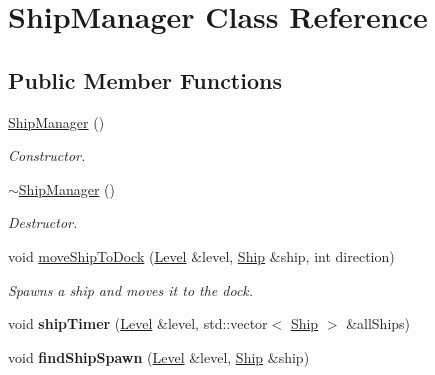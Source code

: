 \hypertarget{class_ship_manager}{}\section{Ship\+Manager Class Reference}
\label{class_ship_manager}
\subsection*{Public Member Functions}
\begin{DoxyCompactItemize}
\item 
\mbox{\label{class_ship_manager_a5c7bc1182e2083180ec4e9f561880ba6}} 
\hyperlink{class_ship_manager_a5c7bc1182e2083180ec4e9f561880ba6}{Ship\+Manager} ()
\begin{DoxyCompactList}\small\item\em Constructor. \end{DoxyCompactList}\item 
\mbox{\label{class_ship_manager_a12f43d1ff5f1d3657030c18be90745bc}} 
\hyperlink{class_ship_manager_a12f43d1ff5f1d3657030c18be90745bc}{$\sim$\+Ship\+Manager} ()
\begin{DoxyCompactList}\small\item\em Destructor. \end{DoxyCompactList}\item 
\mbox{\label{class_ship_manager_adb8e868a32060cef24240c7b9699ba20}} 
void \hyperlink{class_ship_manager_adb8e868a32060cef24240c7b9699ba20}{move\+Ship\+To\+Dock} (\hyperlink{class_level}{Level} \&level, \hyperlink{class_ship}{Ship} \&ship, int direction)
\begin{DoxyCompactList}\small\item\em Spawns a ship and moves it to the dock. \end{DoxyCompactList}\item 
\mbox{\label{class_ship_manager_a24db308b29f58e4de824164047596cd0}} 
void {\bfseries ship\+Timer} (\hyperlink{class_level}{Level} \&level, std\+::vector$<$ \hyperlink{class_ship}{Ship} $>$ \&all\+Ships)
\item 
\mbox{\label{class_ship_manager_a1350a0d3b9dc013e6e7839cb5e3d17e9}} 
void {\bfseries find\+Ship\+Spawn} (\hyperlink{class_level}{Level} \&level, \hyperlink{class_ship}{Ship} \&ship)

\end{DoxyCompactItemize}
